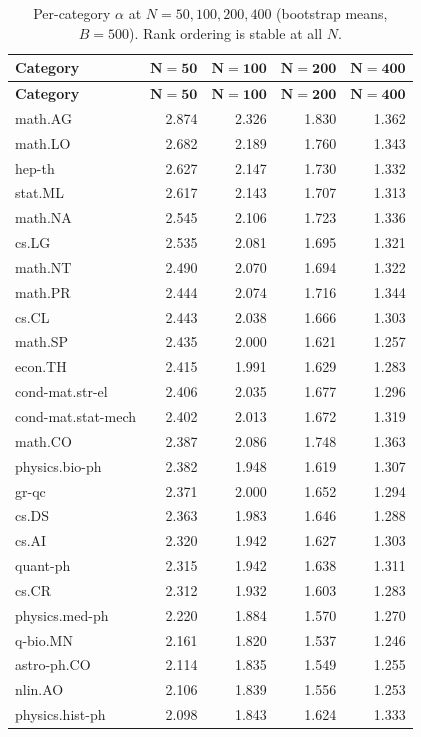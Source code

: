 \documentclass[11pt,letterpaper]{article}
\newcommand{\al}{\alpha}
\begin{document}
\begin{longtable}{lrrrr}
\caption{Per-category $\al$ at $N = 50, 100, 200, 400$ (bootstrap
means, $B = 500$).  Rank ordering is stable at all $N$.} \\
\toprule
\textbf{Category} & $\boldsymbol{N=50}$ & $\boldsymbol{N=100}$ &
$\boldsymbol{N=200}$ & $\boldsymbol{N=400}$ \\
\midrule
\endfirsthead
\toprule
\textbf{Category} & $\boldsymbol{N=50}$ & $\boldsymbol{N=100}$ &
$\boldsymbol{N=200}$ & $\boldsymbol{N=400}$ \\
\midrule
\endhead
math.AG & 2.874 & 2.326 & 1.830 & 1.362 \\
math.LO & 2.682 & 2.189 & 1.760 & 1.343 \\
hep-th & 2.627 & 2.147 & 1.730 & 1.332 \\
stat.ML & 2.617 & 2.143 & 1.707 & 1.313 \\
math.NA & 2.545 & 2.106 & 1.723 & 1.336 \\
cs.LG & 2.535 & 2.081 & 1.695 & 1.321 \\
math.NT & 2.490 & 2.070 & 1.694 & 1.322 \\
math.PR & 2.444 & 2.074 & 1.716 & 1.344 \\
cs.CL & 2.443 & 2.038 & 1.666 & 1.303 \\
math.SP & 2.435 & 2.000 & 1.621 & 1.257 \\
econ.TH & 2.415 & 1.991 & 1.629 & 1.283 \\
cond-mat.str-el & 2.406 & 2.035 & 1.677 & 1.296 \\
cond-mat.stat-mech & 2.402 & 2.013 & 1.672 & 1.319 \\
math.CO & 2.387 & 2.086 & 1.748 & 1.363 \\
physics.bio-ph & 2.382 & 1.948 & 1.619 & 1.307 \\
gr-qc & 2.371 & 2.000 & 1.652 & 1.294 \\
cs.DS & 2.363 & 1.983 & 1.646 & 1.288 \\
cs.AI & 2.320 & 1.942 & 1.627 & 1.303 \\
quant-ph & 2.315 & 1.942 & 1.638 & 1.311 \\
cs.CR & 2.312 & 1.932 & 1.603 & 1.283 \\
physics.med-ph & 2.220 & 1.884 & 1.570 & 1.270 \\
q-bio.MN & 2.161 & 1.820 & 1.537 & 1.246 \\
astro-ph.CO & 2.114 & 1.835 & 1.549 & 1.255 \\
nlin.AO & 2.106 & 1.839 & 1.556 & 1.253 \\
physics.hist-ph & 2.098 & 1.843 & 1.624 & 1.333 \\
\bottomrule
\end{longtable}
\end{document}
